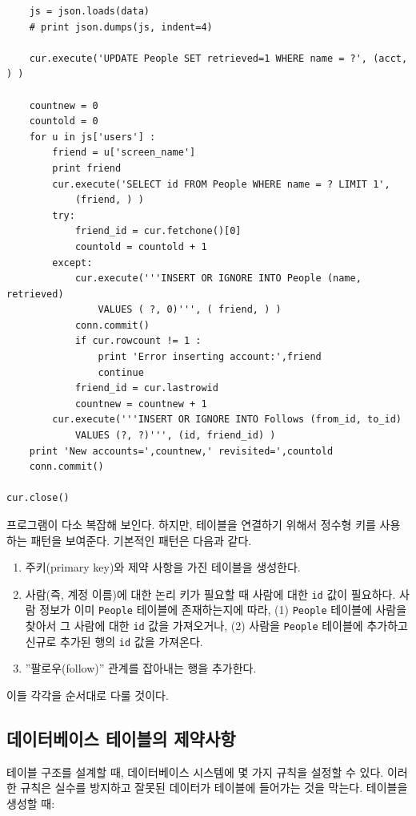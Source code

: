 \begin{verbatim}
    js = json.loads(data)
    # print json.dumps(js, indent=4)

    cur.execute('UPDATE People SET retrieved=1 WHERE name = ?', (acct, ) )

    countnew = 0
    countold = 0
    for u in js['users'] :
        friend = u['screen_name']
        print friend
        cur.execute('SELECT id FROM People WHERE name = ? LIMIT 1', 
            (friend, ) )
        try:
            friend_id = cur.fetchone()[0]
            countold = countold + 1
        except:
            cur.execute('''INSERT OR IGNORE INTO People (name, retrieved) 
                VALUES ( ?, 0)''', ( friend, ) )
            conn.commit()
            if cur.rowcount != 1 :
                print 'Error inserting account:',friend
                continue
            friend_id = cur.lastrowid
            countnew = countnew + 1
        cur.execute('''INSERT OR IGNORE INTO Follows (from_id, to_id) 
            VALUES (?, ?)''', (id, friend_id) )
    print 'New accounts=',countnew,' revisited=',countold
    conn.commit()

cur.close()
\end{verbatim}
\afterverb
%

프로그램이 다소 복잡해 보인다. 
하지만, 테이블을 연결하기 위해서 정수형 키를 사용하는 패턴을 보여준다.
기본적인 패턴은 다음과 같다.

\begin{enumerate}

\item 주키(primary key)와 제약 사항을 가진 테이블을 생성한다.

\item 사람(즉, 계정 이름)에 대한 논리 키가 필요할 때 사람에 대한 {\tt id} 값이 필요하다.
사람 정보가 이미 {\tt People} 테이블에 존재하는지에 따라,
(1) {\tt People} 테이블에 사람을 찾아서 그 사람에 대한 {\tt id} 값을 가져오거나,
(2) 사람을 {\tt People} 테이블에 추가하고 신규로 추가된 행의 {\tt id} 값을 가져온다.

\item ''팔로우(follow)'' 관계를 잡아내는 행을 추가한다.

\end{enumerate}

이들 각각을 순서대로 다룰 것이다.

\subsection{데이터베이스 테이블의 제약사항}

테이블 구조를 설계할 때, 데이터베이스 시스템에 몇 가지 규칙을 설정할 수 있다.
이러한 규칙은 실수를 방지하고 잘못된 데이터가 테이블에 들어가는 것을 막는다.
테이블을 생성할 때:

